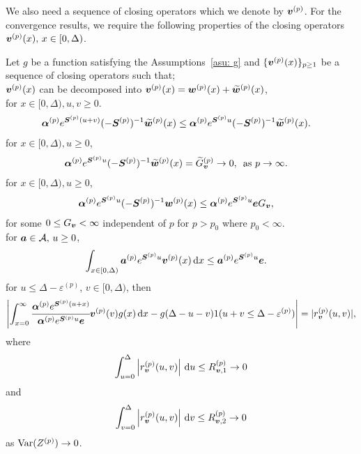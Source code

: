 We also need a sequence of closing operators which we denote by \({\boldsymbol v}^{(p)}\). For the convergence results, we require the following properties of the closing operators \({\boldsymbol v}^{(p)}(x),\, x \in[0,\Delta)\).
\begin{property}\label{properties: some props}
	Let \(g\) be a function satisfying the Assumptions~\ref{asu: g} and \(\{\boldsymbol v^{(p)}(x)\}_{p\geq 1}\) be a sequence of closing operators such that;\\
	\subproperty \label{properties: -3} \(\boldsymbol v^{(p)}(x)\) can be decomposed into \(\boldsymbol v^{(p)}(x)=\boldsymbol w^{(p)}(x) + \widetilde{\boldsymbol w}^{(p)}(x)\), \\
	\subproperty \label{properties: -1} for \(x\in[0,\Delta),u,v\geq 0\). 
        \begin{align*}
        		\boldsymbol \alpha^{(p)} e^{\boldsymbol S^{(p)}(u+v)}(-\boldsymbol S^{(p)})^{-1} \widetilde{\boldsymbol w}^{(p)}(x) &\leq \boldsymbol \alpha^{(p)} e^{\boldsymbol S^{(p)}u}(-\boldsymbol S^{(p)})^{-1} \widetilde{\boldsymbol w}^{(p)}(x).
		\end{align*}
	\subproperty \label{properties: 0} for \(x\in[0,\Delta),u\geq 0\),
		\begin{align*}
			\boldsymbol \alpha^{(p)} e^{\boldsymbol S^{(p)}u}(-\boldsymbol S^{(p)})^{-1} \widetilde{\boldsymbol w}^{(p)}(x) &=\widetilde G_{\boldsymbol v}^{(p)} \to 0,\, \mbox{ as }p \to \infty.  
		\end{align*}
	\subproperty \label{properties: 1} for \(x\in[0,\Delta),u\geq 0\),  
        \begin{align*}
        		\boldsymbol \alpha^{(p)} e^{\boldsymbol S^{(p)}u}(-\boldsymbol S^{(p)})^{-1} \boldsymbol w^{(p)}(x) &\leq \boldsymbol \alpha^{(p)} e^{\boldsymbol S^{(p)}u} \boldsymbol e G_{\boldsymbol v},
	\end{align*}
	for some \(0\leq G_{\boldsymbol v}<\infty\) independent of \(p\) for \(p>p_0\) where \(p_0<\infty\). \\
	\subproperty \label{properties: -2} for \(\boldsymbol a \in\mathcal A,\,u\geq 0\),  
	\begin{align*}
			\int_{x\in[0,\Delta)}\boldsymbol a^{(p)} e^{\boldsymbol S^{(p)}u} {\boldsymbol v}^{(p)}(x) \, \mathrm{d} x&\leq \boldsymbol a^{(p)} e^{\boldsymbol S^{(p)}u} \boldsymbol e.
	\end{align*}
	\subproperty \label{properties: 2} for \(u\leq \Delta-\varepsilon^{(p)}\), \(v\in[0,\Delta)\), then
	\[\left|\int_{x=0}^\infty \cfrac{\boldsymbol \alpha^{(p)} e^{\boldsymbol{S}^{(p)}(u+x)} }{\boldsymbol \alpha^{(p)} e^{\boldsymbol{S}^{(p)}u} \boldsymbol e} {\boldsymbol v}^{(p)}(v)g(x)\, \mathrm{d} x -g(\Delta-u-v) 1(u+v\leq\Delta-\varepsilon^{(p)})\right| =  |r_{\boldsymbol v}^{(p)}(u,v)|,\]
	where 
	\[ \int_{u=0}^{\Delta}\left| r_{\boldsymbol v}^{(p)}(u,v)\right| \, \mathrm{d} u  \leq R_{{\boldsymbol v},1}^{(p)} \to 0\]
	and 
	\[ \int_{v=0}^{\Delta}\left| r_{\boldsymbol v}^{(p)}(u,v)\right| \, \mathrm{d} v  \leq R_{{\boldsymbol v},2}^{(p)} \to 0\]
	as \(\mathrm{Var}(Z^{(p)})\to 0\). 
\end{property}

